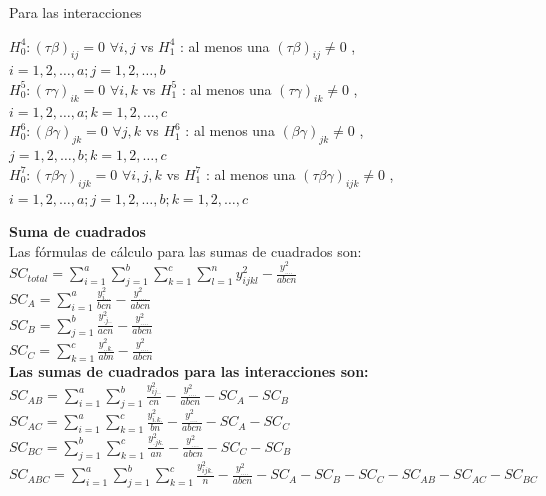 Para las interacciones 
\begin{center}
	$H^{4}_{0} : (\tau \beta)_{ij} = 0$ $ \forall i,j$ vs $H^{4}_{1}$ : al menos una $(\tau \beta)_{ij} \neq 0$ , $i = 1,2, \dots, a; j = 1,2, \dots,b$ \\
	$H^{5}_{0} : (\tau \gamma)_{ik} = 0$ $ \forall i,k$ vs $H^{5}_{1}$ : al menos una $(\tau \gamma)_{ik} \neq 0$ , $i = 1,2, \dots, a; k = 1,2, \dots,c$ \\
	$H^{6}_{0} : (\beta \gamma)_{jk} = 0$ $ \forall j,k$ vs $H^{6}_{1}$ : al menos una $(\beta \gamma)_{jk} \neq 0$ , $j = 1,2, \dots, b; k = 1,2, \dots, c$ \\
	$H^{7}_{0} : (\tau \beta \gamma)_{ijk} = 0$ $ \forall i,j,k$ vs $H^{7}_{1}$ : al menos una $(\tau \beta \gamma)_{ijk} \neq 0$ , $i = 1,2, \dots, a; j = 1,2, \dots, b; k = 1,2, \dots, c$ \\
\end{center}

\textbf{Suma de cuadrados}\\
Las fórmulas de cálculo para las sumas de cuadrados son:\\
$ SC_{total} = \sum_{i=1}^{a}  \sum_{j=1}^{b}  \sum_{k=1}^{c}  \sum_{l=1}^{n} y_{ijkl}^{2} - \frac{y_{....}^{2}}{abcn} $\\

$ SC_{A} = \sum_{i=1}^{a} \frac{y_{i...}^{2}}{bcn}  - \frac{y_{....}^{2}}{abcn} $\\

$ SC_{B} = \sum_{j=1}^{b} \frac{y_{.j..}^{2}}{acn}  - \frac{y_{....}^{2}}{abcn} $\\

$ SC_{C} = \sum_{k=1}^{c} \frac{y_{..k.}^{2}}{abn} - \frac{y_{....}^{2}}{abcn} $\\


\textbf{Las sumas de cuadrados para las interacciones son:}\\

$ SC_{AB} = \sum_{i=1}^{a} \sum_{j=1}^{b}  \frac{y_{ij..}^{2}}{cn}  - \frac{y_{....}^{2}}{abcn} - SC_{A} -SC_{B}  $\\

$ SC_{AC} = \sum_{i=1}^{a} \sum_{k=1}^{c}  \frac{y_{i.k.}^{2}}{bn}  - \frac{y_{....}^{2}}{abcn} - SC_{A} -SC_{C}  $\\

$ SC_{BC} = \sum_{j=1}^{b} \sum_{k=1}^{c}  \frac{y_{.jk.}^{2}}{an}  - \frac{y_{....}^{2}}{abcn} - SC_{C} -SC_{B}  $\\


$ SC_{ABC} =  \sum_{i=1}^{a}  \sum_{j=1}^{b}  \sum_{k=1}^{c}  \frac{y_{ijk.}^{2}}{n}  - \frac{y_{....}^{2}}{abcn} - SC_{A} -SC_{B} - SC_{C} -SC_{AB} -SC_{AC} -SC_{BC}  $\\


